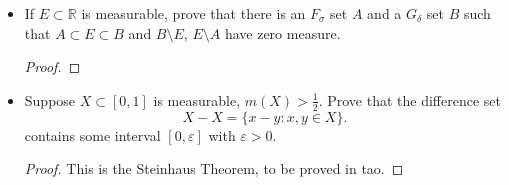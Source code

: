\begin{itemize}
\begin{proof}
	The other part is proven similarly.
\end{proof}
\item If $E \subset \mathbb{R}$ is measurable, prove that there is an $F_\sigma$ set $A$ and a $G_\delta$ set $B$ such that $A \subset E \subset B$ and $B \setminus E$, $E  \setminus A$ have zero measure.
\begin{proof}
	
\end{proof}


\item Suppose $X \subset [0,1]$ is measurable, $m(X) > \frac{1}{2}$. Prove that the difference set
	\[
		X - X = \{x - y: x, y \in X\} 
	.\] 
	contains some interval $[0,\varepsilon]$ with $\varepsilon>0$.
\begin{proof}
	This is the Steinhaus Theorem, to be proved in tao.
\end{proof}


\end{itemize}

